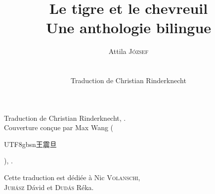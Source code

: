 \documentclass[11pt]{extbook}
\title{Le tigre et le chevreuil\\ {\large Une anthologie bilingue}}
\author{{\Large Attila \textsc{József}}\\\\\\
Traduction de Christian Rinderknecht}
\date{\oldstylenums{2026}}
\makeatletter
\newcommand*{\centeredornament}{\centerline{\pgfornament[width=6cm]{88}}}
\renewcommand{\tableofcontents}{%
  \def\contentsname{\empty}
  \chapter*{\contentsname}%
  \vspace*{-10em} %
  \@starttoc{toc}%
}
\newcommand{\zh}[1]{\begin{CJK}{UTF8}{gbsn}#1\end{CJK}}
\makeatother
\begin{document}
\pagestyle{empty}



\mbox{}

\newpage

\mbox{}

\newpage

\maketitle

\vspace*{\fill}

\begin{flushright}
  \textcopyright{} Traduction de Christian Rinderknecht,
  .\\
  \textcopyright{} Couverture conçue par Max Wang (\zh{王震旦}), .
\end{flushright}

\newpage

\vspace*{4cm}

\begin{flushright}
  Cette traduction est dédiée à Nic \textsc{Volanschi}, \\
  \textsc{Juhász} Dávid et \textsc{Dudás} Réka.
\end{flushright}

\newpage
\newpage

%

\tableofcontents


\clearpage
\pagestyle{plain}


\vspace*{-15mm}
\centeredornament


\end{document}
